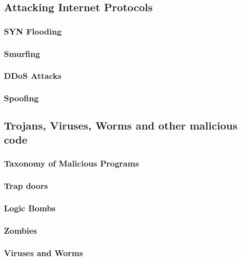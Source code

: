 \documentclass[a4paper, 10 pt, conference]{ieeeconf}
\begin{document}
\subsection{\textbf{Attacking Internet Protocols}}

\subsubsection{\textbf{SYN Flooding}}

\subsubsection{\textbf{Smurfing}}

\subsubsection{\textbf{DDoS Attacks}}

\subsubsection{\textbf{Spoofing}}

\subsection{\textbf{Trojans, Viruses, Worms and other malicious code}}

\subsubsection{\textbf{Taxonomy of Malicious Programs}}

\subsubsection{\textbf{Trap doors}}

\subsubsection{\textbf{Logic Bombs}}

\subsubsection{\textbf{Zombies}}

\subsubsection{\textbf{Viruses and Worms}}
\end{document}

